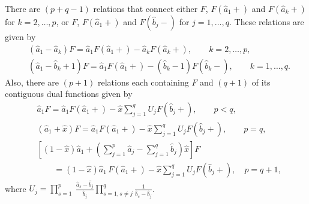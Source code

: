 \documentclass[11pt,a4paper,fleqn]{article}
\numberwithin{equation}{section}
\numberwithin{lemma}{section}
\numberwithin{theorem}{section}
\numberwithin{corollary}{section}
\begin{document}
There are $(p+q-1)$ relations that connect either $F$, $F(\widehat{a}_1+)$ and $F(\widehat{a}_k+)$ for $k= 2, \dots, p$, or  $F$, $F(\widehat{a}_1+)$ and $F(\widehat{b}_j-)$ for $j= 1, \dots, q$. These relations are given by
\begin{align}
	&(\widehat{a}_1-\widehat{a}_k)F = \widehat{a}_1F(\widehat{a}_1+) - \widehat{a}_kF(\widehat{a}_k+), \qquad k = 2,  \dots, p, \label{eq6.2} \\
	&(\widehat{a}_1-\widehat{b}_k+1)F = \widehat{a}_1F(\widehat{a}_1+) - (\widehat{b}_k-1)F(\widehat{b}_k-), \qquad     k = 1, \dots, q.\label{eq6.3}
\end{align}
Also, there are $(p+1)$ relations each containing $F$ and $(q+1)$ of its contiguous dual functions given by
\begin{align}
	& \widehat{a}_1F  = \widehat{a}_1F(\widehat{a}_1+) - \widehat{x} \sum_{j=1}^{q} U_j F(\widehat{b}_j+), \qquad p < q, \label{eq6.4}\\
	&(\widehat{a}_1 + \widehat{x})F  = \widehat{a}_1F(\widehat{a}_1+) - \widehat{x} \sum_{j=1}^{q} U_j F(\widehat{b}_j+), \qquad p = q,\label{eq6.5} \\
	&\left[(1-\widehat{x})\widehat{a}_1 + \left(\sum_{j=1}^{p} \widehat{a}_j - \sum_{j=1}^{q} \widehat{b}_j\right)\widehat{x}\right]F \nonumber\\
	&\qquad = (1-\widehat{x})\widehat{a}_1 \, F(\widehat{a}_1+) - \widehat{x} \sum_{j=1}^{q} U_j F(\widehat{b}_j+), \quad p = q+1, \label{eq6.6}
\end{align} 
where $U_j = \displaystyle\prod_{s=1}^{p} \ \frac{\widehat{a}_s-\widehat{b}_j}{\widehat{b}_j} \prod_{s=1, s\ne j}^{q} \frac{1}{ \widehat{b}_s-\widehat{b}_j}$.
\end{document}
